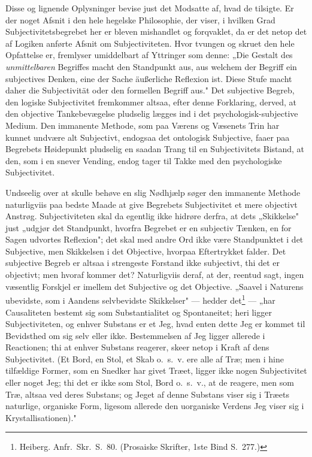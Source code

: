 \documentclass[12pt]{book}
\newcommand{\opage}[1]{\marginnote{\footnotesize\textit{[#1]}}}
\begin{document}
Disse og lignende Oplysninger bevise just det Modsatte af, hvad de tilsigte. Er der noget
Afsnit i den hele hegelske Philosophie, der viser, i hvilken Grad Subjectivitetsbegrebet
her er bleven mishandlet og forqvaklet, da er det netop det af Logiken anførte Afsnit om
Subjectiviteten. Hvor tvungen og skruet den hele Opfattelse er, fremlyser umiddelbart af
Yttringer som denne: „Die Gestalt des \emph{unmittelbaren} Begriffes macht den Standpunkt
aus, aus welchem der Begriff ein subjectives Denken, eine der Sache äußerliche Reflexion
\opage{141} ist. Diese Stufe macht daher die Subjectivität oder den formellen Begriff aus." Det
subjective Begreb, den logiske Subjectivitet fremkommer altsaa, efter denne Forklaring,
derved, at den objective Tankebevægelse pludselig lægges ind i det psychologisk-subjective
Medium. Den immanente Methode, som paa Værens og Væsenets Trin har kunnet undvære alt
Subjectivt, endogsaa det ontologisk Subjective, faaer paa Begrebets Høidepunkt pludselig
en saadan Trang til en Subjectivitets Bistand, at den, som i en snever Vending, endog tager
til Takke med den psychologiske Subjectivitet.

Undseelig over at skulle behøve en slig Nødhjælp søger den immanente Methode naturligviis
paa bedste Maade at give Begrebets Subjectivitet et mere objectivt Anstrøg. Subjectiviteten
skal da egentlig ikke hidrøre derfra, at dets „Skikkelse" just „udgjør det Standpunkt,
hvorfra Begrebet er en subjectiv Tænken, en for Sagen udvortes Reflexion"; det skal med
andre Ord ikke være Standpunktet i det Subjective, men Skikkelsen i det Objective, hvorpaa
Eftertrykket falder. Det subjective Begreb er altsaa i strengeste Forstand ikke subjectivt,
thi det er objectivt; men hvoraf kommer det? Naturligviis deraf, at der, reentud sagt,
ingen væsentlig Forskjel er imellem det Subjective og det Objective. „Saavel i Naturens
ubevidste, som i Aandens selvbevidste Skikkelser" --- hedder det\footnote{Heiberg. Anfr.\
Skr.\ S.~80. (Prosaiske Skrifter, 1ste Bind S.~277.)} --- „har Causaliteten bestemt sig som
Substantialitet og Spontaneitet; heri ligger Subjectiviteten, og enhver Substans er et Jeg,
hvad enten dette Jeg er kommet til Bevidsthed om sig selv eller ikke. Bestemmelsen af Jeg
ligger allerede i Reactionen; thi at enhver Substans reagerer, skeer netop i Kraft af dens
Subjectivitet. (Et Bord, en Stol, et Skab o.\ s.\ v. ere alle af Træ; men i hine
tilfældige Former, som en Snedker har givet Træet, ligger ikke nogen Subjectivitet eller
noget Jeg; thi det er ikke som Stol, Bord o.\ s.\ v., at de
\opage{142} reagere, men som Træ, altsaa ved deres Substans; og Jeget af denne Substans viser sig i
Træets naturlige, organiske Form, ligesom allerede den uorganiske Verdens Jeg viser sig i
Krystallisationen)."
\end{document}

